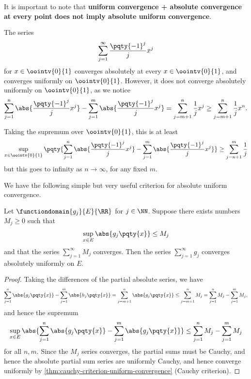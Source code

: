 \begin{remark}
    It is important to note that \textbf{uniform convergence + absolute convergence at every point does not imply absolute uniform convergence}.
\end{remark}

\begin{example}
    The series
    \[
        \sum_{j = 1}^{\infty} \frac{\pqty{-1}^j}{j} x^j
    \]
    for \(x \in \oointv{0}{1}\) converges absolutely at every \(x \in \oointv{0}{1}\), and converges uniformly on \(\oointv{0}{1}\). However, it does not converge absolutely uniformly on \(\oointv{0}{1}\), as we notice
    \[
        \sum_{j = 1}^{n} \abs{\frac{\pqty{-1}^j}{j} x^j} - \sum_{j = 1}^{m} \abs{\frac{\pqty{-1}^j}{j} x^j} = \sum_{j = m + 1}^{n} \frac{1}{j} x^j \geq \sum_{j = m + 1}^{n} \frac{1}{j} x^n.
    \]

    Taking the supremum over \(\oointv{0}{1}\), this is at least
    \[
        \sup_{x \in \oointv{0}{1}} \pqty{\sum_{j = 1}^{n} \abs{\frac{\pqty{-1}^j}{j} x^j} - \sum_{j = 1}^{m} \abs{\frac{\pqty{-1}^j}{j} x^j}} \geq \sum_{j = n + 1}^{m} \frac{1}{j}
    \]
    but this goes to infinity as \(n \to \infty\), for any fixed \(m\).
\end{example}

We have the following simple but very useful criterion for absolute uniform convergence.

\begin{theorem}
    \label{thm:weierstrass-m-test}%
    Let \(\functiondomain{g_j}{E}{\RR}\) for \(j \in \NN\). Suppose there exists numbers \(M_j \geq 0\) such that
    \[
        \sup_{x \in E} \abs{g_j\pqty{x}} \leq M_j
    \]
    and that the series \(\sum_{j = 1}^{\infty} M_j\) converges. Then the series \(\sum_{j = 1}^{\infty} g_j\) converges absolutely uniformly on \(E\).
\end{theorem}

\begin{proof}
    Taking the differences of the partial absolute series, we have
    \[
        \sum_{j = 1}^{n} \abs{g_j \pqty{x}} - \sum_{j = 1}^{m} \abs{h_j \pqty{x}} = \sum_{j = m + 1}^{n} \abs{g_j \pqty{x}} \leq \sum_{j = m + 1}^{n} M_j = \sum_{j = 1}^{n} M_j - \sum_{j = 1}^{m} M_j,
    \]
    and hence the supremum
    \[
        \sup_{x \in E} \abs{\sum_{j = 1}^{n} \abs{g_j \pqty{x}} - \sum_{j = 1}^{m} \abs{g_j \pqty{x}}} \leq \sum_{j = 1}^{n} M_j - \sum_{j = 1}^{m} M_j
    \]
    for all \(n, m\). Since the \(M_j\) series converges, the partial sums must be Cauchy, and hence the absolute partial sum series are uniformly Cauchy, and hence converge uniformly by \autoref{thm:cauchy-criterion-uniform-convergence} (Cauchy criterion).
\end{proof}

